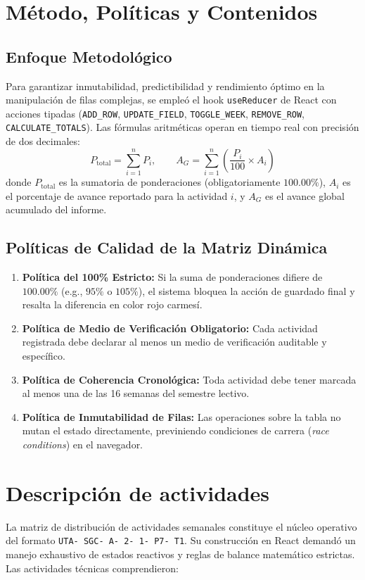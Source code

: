 \documentclass[12pt,a4paper]{article}
\begin{document}
\section{Método, Políticas y Contenidos}
\subsection{Enfoque Metodológico}
Para garantizar inmutabilidad, predictibilidad y rendimiento óptimo en la manipulación de filas complejas, se empleó el hook \texttt{useReducer} de React con acciones tipadas (\texttt{ADD\_\allowbreak  ROW}, \texttt{UPDATE\_\allowbreak  FIELD}, \texttt{TOGGLE\_\allowbreak  WEEK}, \texttt{REMOVE\_\allowbreak  ROW}, \texttt{CALCULATE\_\allowbreak  TOTALS}). Las fórmulas aritméticas operan en tiempo real con precisión de dos decimales:
\begin{equation}
    P_{\text{total}} = \sum_{i=1}^{n} P_i, \qquad A_G = \sum_{i=1}^{n} \left( \frac{P_i}{100} \times A_i \right)
\end{equation}
donde $P_{\text{total}}$ es la sumatoria de ponderaciones (obligatoriamente $100.00\%$), $A_i$ es el porcentaje de avance reportado para la actividad $i$, y $A_G$ es el avance global acumulado del informe.

\subsection{Políticas de Calidad de la Matriz Dinámica}
\begin{enumerate}[leftmargin=1.5em, itemsep=2pt]
    \item \textbf{Política del 100\% Estricto:} Si la suma de ponderaciones difiere de $100.00\%$ (e.g., $95\%$ o $105\%$), el sistema bloquea la acción de guardado final y resalta la diferencia en color rojo carmesí.
    \item \textbf{Política de Medio de Verificación Obligatorio:} Cada actividad registrada debe declarar al menos un medio de verificación auditable y específico.
    \item \textbf{Política de Coherencia Cronológica:} Toda actividad debe tener marcada al menos una de las 16 semanas del semestre lectivo.
    \item \textbf{Política de Inmutabilidad de Filas:} Las operaciones sobre la tabla no mutan el estado directamente, previniendo condiciones de carrera (\textit{race conditions}) en el navegador.
\end{enumerate}

\section{Descripción de actividades}
La matriz de distribución de actividades semanales constituye el núcleo operativo del formato \texttt{UTA- SGC- A- 2- 1- P7- T1}. Su construcción en React demandó un manejo exhaustivo de estados reactivos y reglas de balance matemático estrictas. Las actividades técnicas comprendieron:
\end{document}
